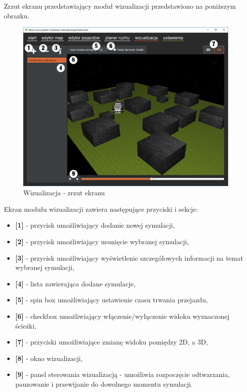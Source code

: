 \documentclass[a4paper,11pt,twoside]{report}
\theoremstyle{definition}
\begin{document}
Zrzut ekranu przedstawiający moduł wizualizacji przedstawiono na poniższym obrazku.

\begin{figure}[h!]
\centering
\includegraphics[scale=0.5]{instructionVisualisation}
\caption[Wizualizacja - zrzut ekranu]{Wizualizacja - zrzut ekranu}
\end{figure}

Ekran modułu wizualizacji zawiera następujące przyciski i sekcje:
\begin{itemize}
	\item \textbf{[1]} - przycisk umożliwiający dodanie nowej symulacji,
	\item \textbf{[2]} - przycisk umożliwiający usunięcie wybranej symulacji,
	\item \textbf{[3]} - przycisk umożliwiający wyświetlenie szczegółowych informacji na temat wybranej symulacji,
	\item \textbf{[4]} - lista zawierająca dodane symulacje,
	\item \textbf{[5]} - spin box umożliwiający ustawienie czasu trwania przejazdu,
	\item \textbf{[6]} - checkbox umożliwiający włączenie/wyłączenie widoku wyznaczonej ścieżki,
	\item \textbf{[7]} - przyciski umożliwiające zmianę widoku pomiędzy 2D, a 3D,
	\item \textbf{[8]} - okno wizualizacji,
	\item \textbf{[9]} - panel sterowania wizualizacją - umożliwia rozpoczęcie odtwarzania, pauzowanie i przewijanie do dowolnego momentu symulacji.
\end{itemize}
\end{document}
